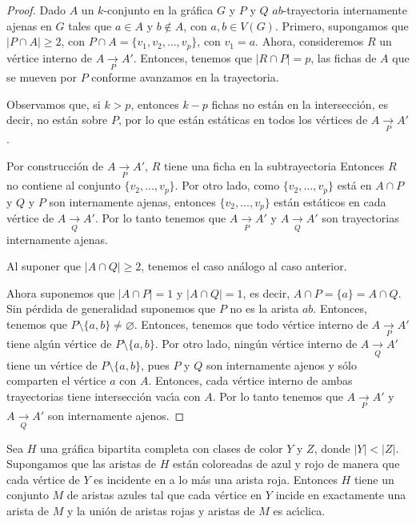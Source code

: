 \begin{proof}
    Dado $A$ un $k$-conjunto en la gr\'afica $G$ y $P$ y $Q$
    $ab$-trayectoria internamente ajenas en $G$ tales que $a \in A$ y $b
    \notin A$, con $a, b \in V(G)$. Primero, supongamos que $|P \cap A| \geq 2$,
    con $P \cap A = \{v_{1}, v_{2}, \dots , v_{p}\}$, con $v_{1} = a$. Ahora, 
    consideremos $R$ un v\'ertice interno de $A \xrightarrow[P]{} A'$. Entonces,
    tenemos que  $|R \cap P| = p$, las fichas de $A$ que se mueven por $P$
    conforme avanzamos en la trayectoria. 

    Observamos que, si $k>p$, entonces $k -p$ fichas no est\'an en la
    intersecci\'on, es decir, no est\'an sobre $P$, por lo que est\'an
    est\'aticas en todos los v\'ertices de $A \xrightarrow[P]{} A'$. 

    Por construcci\'on de $A \xrightarrow[P]{} A'$, $R$ tiene una ficha en la
    subtrayectoria %
    Entonces $R$ no contiene al conjunto $\{v_{2}, \dots, v_{p}\}$. Por otro
    lado, como $\{v_{2}, \dots, v_{p}\}$ est\'a en $A \cap P$ y $Q$ y $P$ son
    internamente ajenas, entonces $\{v_{2}, \dots, v_{p}\}$ est\'an est\'aticos
    en cada v\'ertice de $A \xrightarrow[Q]{} A'$. Por lo tanto tenemos que $A
    \xrightarrow[P]{} A'$ y $A \xrightarrow[Q]{}A'$ son trayectorias
    internamente ajenas.

    Al suponer que $|A \cap Q| \geq 2$, tenemos el caso an\'alogo al caso
    anterior.

    Ahora suponemos que $|A \cap P| = 1$ y $|A \cap Q| = 1$, es decir, $A \cap P
    = \{a\} = A \cap Q$. Sin p\'erdida de generalidad suponemos que $P$ no es la
    arista $ab$. Entonces, tenemos que $P \setminus \{a,b\} \neq \varnothing$.
    Entonces, tenemos que todo v\'ertice interno de $A \xrightarrow[P]{} A'$
    tiene alg\'un v\'ertice de $P \setminus \{a, b\}$. Por otro lado, ning\'un
    v\'ertice interno de $A \xrightarrow[Q]{} A'$ tiene un v\'ertice de $P
    \setminus \{a, b\}$, pues $P$ y $Q$ son internamente ajenos y s\'olo
    comparten el v\'ertice $a$ con $A$. Entonces, cada v\'ertice interno de
    ambas trayectorias tiene intersecci\'on vac\'\i{}a con $A$. Por lo tanto
    tenemos que $A \xrightarrow[P]{} A'$ y $A \xrightarrow[Q]{} A'$ son
    internamente ajenos.
\end{proof}

\begin{lema}%
\label{lem:segundo}
    Sea $H$ una gr\'afica bipartita completa con clases de color $Y$ y $Z$,
    donde $|Y|<|Z|$. Supongamos que las aristas de $H$ est\'an coloreadas de
    azul y rojo de manera que cada v\'ertice de $Y$ es incidente en a lo m\'as
    una arista roja. Entonces $H$ tiene un conjunto $M$ de aristas azules tal
    que cada v\'ertice en $Y$ incide en exactamente una arista de $M$ y la
    uni\'on de aristas rojas y aristas de $M$ es ac\'\i{}clica.
\end{lema}

